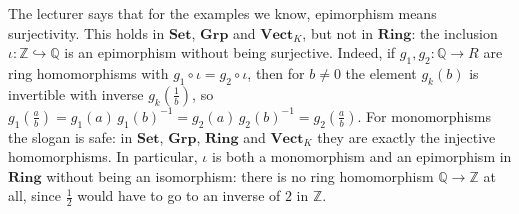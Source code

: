 \begin{content}[Epimorphisms]

{\centering
{}\par}
\end{content}

\begin{aiNote}
The lecturer says that for the examples we know, epimorphism means surjectivity. This holds in $\mathbf{Set}$, $\mathbf{Grp}$ and $\mathbf{Vect}_K$, but not in $\mathbf{Ring}$: the inclusion $\iota \colon \mathbb{Z} \hookrightarrow \mathbb{Q}$ is an epimorphism without being surjective. Indeed, if $g_1, g_2 \colon \mathbb{Q} \to R$ are ring homomorphisms with $g_1 \circ \iota = g_2 \circ \iota$, then for $b \neq 0$ the element $g_k(b)$ is invertible with inverse $g_k(\frac{1}{b})$, so $g_1(\frac{a}{b}) = g_1(a) \, g_1(b)^{-1} = g_2(a) \, g_2(b)^{-1} = g_2(\frac{a}{b})$. For monomorphisms the slogan is safe: in $\mathbf{Set}$, $\mathbf{Grp}$, $\mathbf{Ring}$ and $\mathbf{Vect}_K$ they are exactly the injective homomorphisms. In particular, $\iota$ is both a monomorphism and an epimorphism in $\mathbf{Ring}$ without being an isomorphism: there is no ring homomorphism $\mathbb{Q} \to \mathbb{Z}$ at all, since $\frac{1}{2}$ would have to go to an inverse of $2$ in $\mathbb{Z}$.
\end{aiNote}

